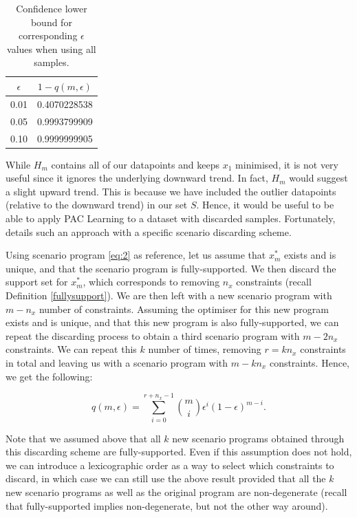\documentclass[11pt]{article}
\begin{document}
\begin{table}[]
\centering
\begin{tabular}{@{}cc@{}}
\toprule
\textbf{$\epsilon$} & \textbf{$1-q(m,\epsilon)$} \\ \midrule
0.01                & 0.4070228538               \\
0.05                & 0.9993799909               \\
0.10                & 0.9999999905               \\ \bottomrule
\end{tabular}
\caption{Confidence lower bound for corresponding $\epsilon$ values when using all samples.}
\label{tab:confidence}
\end{table}

While $H_{m}$ contains all of our datapoints and keeps $x_{1}$ minimised, it is not very useful since it ignores the underlying downward trend. In fact, $H_{m}$ would suggest a slight upward trend. This is because we have included the outlier datapoints (relative to the downward trend) in our set $S$. Hence, it would be useful to be able to apply PAC Learning to a dataset with discarded samples. Fortunately, \cite{kostas} details such an approach with a specific scenario discarding scheme.

Using scenario program \ref{eq:2} as reference, let us assume that $x^{*}_{m}$ exists and is unique, and that the scenario program is fully-supported. We then discard the support set for $x^{*}_{m}$, which corresponds to removing $n_{x}$ constraints (recall Definition \ref{fullysupport}). We are then left with a new scenario program with $m-n_{x}$ number of constraints. Assuming the optimiser for this new program exists and is unique, and that this new program is also fully-supported, we can repeat the discarding process to obtain a third scenario program with $m-2n_{x}$ constraints. We can repeat this $k$ number of times, removing $r=kn_{x}$ constraints in total and leaving us with a scenario program with $m-kn_{x}$ constraints. Hence, we get the following:

\begin{equation}
	\label{eq:6}
	q(m,\epsilon) = \sum_{i=0}^{r+n_{x}-1}{\binom{m}{i}}\epsilon^{i}(1-\epsilon)^{m-i}.
\end{equation}

Note that we assumed above that all $k$ new scenario programs obtained through this discarding scheme are fully-supported. Even if this assumption does not hold, we can introduce a lexicographic order as a way to select which constraints to discard, in which case we can still use the above result provided that all the $k$ new scenario programs as well as the original program are non-degenerate (recall that fully-supported implies non-degenerate, but not the other way around).
\end{document}
